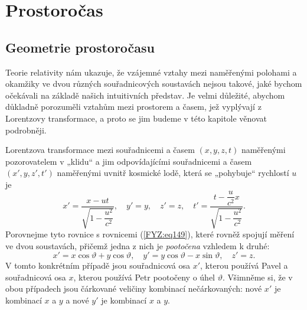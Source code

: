 {
\chapter{Prostoročas}\label{fyz:IchapXVII}
\minitoc
  \section{Geometrie prostoročasu}\label{fyz:IchapXVIIsecI}
    Teorie relativity nám ukazuje, že vzájemné vztahy mezi naměřenými polohami a okamžiky ve dvou 
    různých souřadnicových soustavách nejsou takové, jaké bychom očekávali na základě našich 
    intuitivních představ. Je velmi důležité, abychom důkladně porozuměli vztahům mezi prostorem a 
    časem, jež vyplývají z Lorentzovy transformace, a proto se jim budeme v této kapitole věnovat 
    podrobněji.
    
    Lorentzova transformace mezi souřadnicemi a časem \newline\((x, y, z, t)\) naměřenými 
    pozorovatelem v „klidu“ a jim odpovídajícími souřadnicemi a časem \((x', y, z', t')\) 
    naměřenými uvnitř kosmické lodě, která se „pohybuje“ rychlostí \(u\) je
    \begin{equation}\label{FYZ:eq220}
      x' = \frac{x - ut}{\sqrt{1-\dfrac{u^2}{c^2}}}, \quad
      y' = y, \quad z' = z,                         \quad
      t' = \frac{t-\dfrac{u}{c^2}x}{\sqrt{1-\dfrac{u^2}{c^2}}}. 
    \end{equation} 
    Porovnejme tyto rovnice s rovnicemi (\ref{FYZ:eq149}), které rovněž spojují měření ve dvou 
    soustavách, přičemž jedna z nich je \emph{pootočena} vzhledem k druhé:
    \begin{equation}\label{FYZ:eq221}
      x' = x\cos\vartheta + y\cos\vartheta, \quad
      y' = y\cos\vartheta - x\sin\vartheta, \quad
      z' = z.
    \end{equation}
    V tomto konkrétním případě jsou souřadnicová osa \(x'\), kterou používá Pavel a souřadnicová 
    osa \(x\), kterou používá Petr pootočeny o úhel \(\vartheta\). Všimněme si, že v obou případech 
    jsou čárkované veličiny kombinací nečárkovaných: nové \(x'\) je kombinací \(x\) a \(y\) a nové 
    \(y'\) je kombinací \(x\) a \(y\).
    
}
